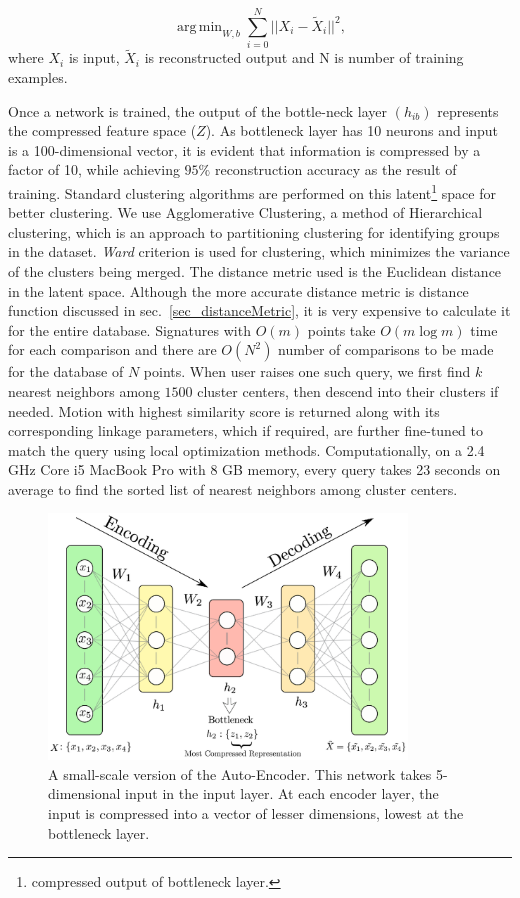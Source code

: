 \documentclass[twocolumn,10pt]{asme2e}
\DeclareMathOperator*{\argminA}{arg\,min}
\begin{document}
\begin{equation}\label{nnloss}
  \argminA_{W, b} \sum_{i=0}^{N} || X_i - \tilde{X}_i ||^2,
\end{equation}
where $X_i$ is input, $\tilde{X}_i$ is reconstructed output and N is number of training examples.


Once a network is trained, the output of the bottle-neck layer $(h_{ib})$ represents the compressed feature space ($Z$).
As bottleneck layer has 10 neurons and input is a 100-dimensional vector, it is evident that information is compressed by a factor of 10, while achieving $95\%$ reconstruction accuracy as the result of training.
Standard clustering algorithms are performed on this latent\footnote{compressed output of bottleneck layer.} space for better clustering\cite{song2013}.
We use Agglomerative Clustering, a method of Hierarchical clustering, which is an approach to partitioning clustering for identifying groups in the dataset.
\emph{Ward}\cite{ward1963} criterion is used for clustering, which minimizes the variance of the clusters being merged.
The distance metric used is the Euclidean distance in the latent space.
Although the more accurate distance metric is distance function discussed in sec.~\ref{sec_distanceMetric}, it is very expensive to calculate it for the entire database.
Signatures with ${O}(m)$ points take ${O}(m\log{}m)$ time for each comparison and there are ${O}(N^2)$ number of comparisons to be made for the database of $N$ points.
When user raises one such query, we first find $k$ nearest neighbors among $1500$ cluster centers, then descend into their clusters if needed.
Motion with highest similarity score is returned along with its corresponding linkage parameters, which if required, are further fine-tuned to match the query using local optimization methods. Computationally, on a 2.4 GHz Core i5 MacBook Pro with 8 GB memory, every query takes 23 seconds on average to find the sorted list of nearest neighbors among cluster centers.

\begin{figure}
\centering
\includegraphics[width=270pt]{figure/fig_auto_encoder.eps}
  \caption{A small-scale version of the Auto-Encoder. This network takes 5-dimensional input in the input layer. At each encoder layer, the input is compressed into a vector of lesser dimensions, lowest at the bottleneck layer.}
\label{autoEncoder}
\end{figure}
\end{document}
